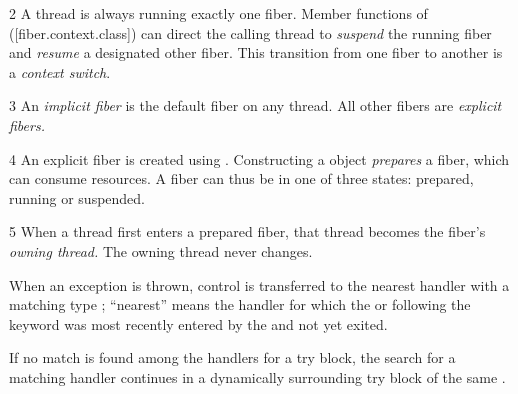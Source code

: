 
2 A thread is always running exactly one fiber. Member functions of \fiber
([fiber.context.class]) can direct the calling thread to \emph{suspend} the
running fiber and \emph{resume} a designated other fiber. This transition from
one fiber to another is a \emph{context switch}.

3 An \emph{implicit fiber} is the default fiber on any thread. All other
fibers are \emph{explicit fibers.}

4 An explicit fiber is created using \fiber. Constructing a \fiber object \emph{prepares} a
fiber, which can consume resources. A fiber can thus be in one of three
states: prepared, running or suspended.

5 When a thread first enters a prepared fiber, that thread becomes the
fiber's \emph{owning thread.} The owning thread never changes.
\cbend


When an exception is thrown, control is transferred to the nearest handler
with a matching type ; ``nearest'' means the handler for
which the  or
 following the  keyword was
most recently entered by the  and
not yet exited.




If no match is found among the handlers for a try block, the search for a
matching handler continues in a dynamically surrounding try block of the same
.


